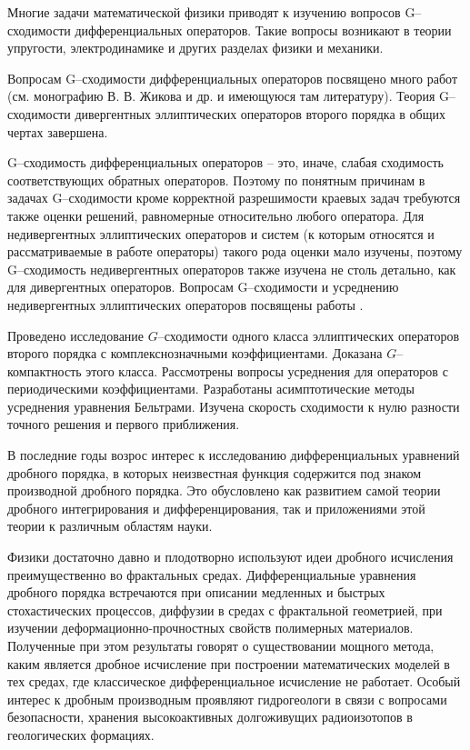 Многие задачи математической физики приводят к изучению вопросов G--сходимости дифференциальных операторов. Такие вопросы возникают в теории упругости, электродинамике и других разделах физики и механики.

Вопросам G--сходимости  дифференциальных операторов посвящено много работ (см. монографию В. В. Жикова и др. \cite{JikovKozlov} и имеющуюся там литературу). Теория  G--сходимости  дивергентных эллиптических операторов второго порядка в общих чертах завершена.

G--сходимость дифференциальных операторов -- это, иначе, слабая сходимость соответствующих обратных операторов. Поэтому по понятным причинам в задачах G--сходимости кроме корректной разрешимости краевых задач требуются также оценки решений, равномерные относительно любого оператора. Для недивергентных эллиптических операторов и систем (к которым относятся и рассматриваемые в работе операторы) такого рода оценки мало изучены, поэтому G--сходимость недивергентных операторов также изучена не столь детально, как для дивергентных операторов.
Вопросам G--сходимости и усреднению недивергентных эллиптических операторов посвящены работы \cite{JikovSirazh1, JikovSirazh2, Sirazh1, Sirazh2, Sirazh3}.

Проведено исследование $G$--сходимости одного класса эллиптических операторов второго порядка с комплекснозначными коэффициентами. Доказана $G$--компактность этого класса. Рассмотрены вопросы усреднения для операторов с периодическими коэффициентами. Разработаны асимптотические методы усреднения уравнения Бельтрами. Изучена скорость сходимости к нулю разности точного решения и первого приближения.


В последние годы возрос интерес к исследованию дифференциальных уравнений дробного порядка, в которых неизвестная функция содержится под знаком производной дробного порядка. Это обусловлено как развитием самой теории дробного интегрирования и дифференцирования, так и приложениями этой теории к различным областям науки.

Физики достаточно давно и плодотворно используют идеи дробного исчисления преимущественно во фрактальных средах. Дифференциальные уравнения дробного порядка встречаются при описании медленных и быстрых стохастических процессов, диффузии в средах с фрактальной геометрией, при изучении деформационно-прочностных свойств полимерных материалов. Полученные при этом результаты говорят о существовании мощного метода, каким является дробное исчисление при построении математических моделей в тех средах, где классическое дифференциальное исчисление не работает. Особый интерес к дробным производным проявляют гидрогеологи в связи с вопросами безопасности, хранения высокоактивных долгоживущих радиоизотопов в геологических формациях.


